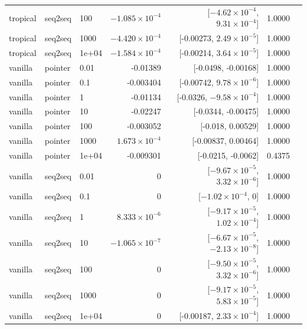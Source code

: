 \documentclass[10pt]{article}
\begin{document}
{\begin{longtable}{lllrrrl}
tropical & seq2seq & 100 & $-1.085\times10^{-4}$ & [$-4.62\times10^{-4}$, $9.31\times10^{-4}$] & 1.0000 & \\
tropical & seq2seq & 1000 & $-4.420\times10^{-4}$ & [-0.00273, $2.49\times10^{-5}$] & 1.0000 & \\
tropical & seq2seq & 1e+04 & $-1.584\times10^{-4}$ & [-0.00214, $3.64\times10^{-5}$] & 1.0000 & \\
vanilla & pointer & 0.01 & -0.01389 & [-0.0498, -0.00168] & 1.0000 & \\
vanilla & pointer & 0.1 & -0.003404 & [-0.00742, $9.78\times10^{-6}$] & 1.0000 & \\
vanilla & pointer & 1 & -0.01134 & [-0.0326, $-9.58\times10^{-4}$] & 1.0000 & \\
vanilla & pointer & 10 & -0.02247 & [-0.0344, -0.00475] & 1.0000 & \\
vanilla & pointer & 100 & -0.003052 & [-0.018, 0.00529] & 1.0000 & \\
vanilla & pointer & 1000 & $1.673\times10^{-4}$ & [-0.00837, 0.00464] & 1.0000 & \\
vanilla & pointer & 1e+04 & -0.009301 & [-0.0215, -0.0062] & 0.4375 & \\
vanilla & seq2seq & 0.01 & 0 & [$-9.67\times10^{-5}$, $3.32\times10^{-6}$] & 1.0000 & \\
vanilla & seq2seq & 0.1 & 0 & [$-1.02\times10^{-4}$, 0] & 1.0000 & \\
vanilla & seq2seq & 1 & $8.333\times10^{-6}$ & [$-9.17\times10^{-5}$, $1.02\times10^{-4}$] & 1.0000 & \\
vanilla & seq2seq & 10 & $-1.065\times10^{-7}$ & [$-6.67\times10^{-5}$, $-2.13\times10^{-8}$] & 1.0000 & \\
vanilla & seq2seq & 100 & 0 & [$-9.50\times10^{-5}$, $3.32\times10^{-6}$] & 1.0000 & \\
vanilla & seq2seq & 1000 & 0 & [$-9.17\times10^{-5}$, $5.83\times10^{-5}$] & 1.0000 & \\
vanilla & seq2seq & 1e+04 & 0 & [-0.00187, $2.33\times10^{-4}$] & 1.0000 & \\
\bottomrule
\end{longtable}
}
\end{document}
